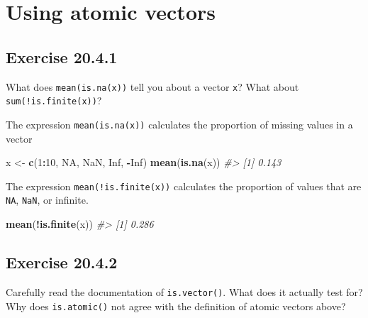 \documentclass[]{book}
\newenvironment{Shaded}{\begin{snugshade}}{\end{snugshade}}
\newcommand{\CommentTok}[1]{\textcolor[rgb]{0.56,0.35,0.01}{\textit{#1}}}
\newcommand{\DecValTok}[1]{\textcolor[rgb]{0.00,0.00,0.81}{#1}}
\newcommand{\KeywordTok}[1]{\textcolor[rgb]{0.13,0.29,0.53}{\textbf{#1}}}
\newcommand{\NormalTok}[1]{#1}
\newcommand{\OperatorTok}[1]{\textcolor[rgb]{0.81,0.36,0.00}{\textbf{#1}}}
\newcommand{\OtherTok}[1]{\textcolor[rgb]{0.56,0.35,0.01}{#1}}
\newcommand{\StringTok}[1]{\textcolor[rgb]{0.31,0.60,0.02}{#1}}
\theoremstyle{plain}
\theoremstyle{remark}
\theoremstyle{definition}
\theoremstyle{definition}
\theoremstyle{definition}
\theoremstyle{remark}
\begin{document}
\hypertarget{using-atomic-vectors}{%
\section{Using atomic vectors}\label{using-atomic-vectors}}

\hypertarget{exercise-20.4.1}{%
\subsection*{\texorpdfstring{Exercise
{20.4.1}}{Exercise 20.4.1}}\label{exercise-20.4.1}}

What does \texttt{mean(is.na(x))} tell you about a vector \texttt{x}?
What about \texttt{sum(!is.finite(x))}?

The expression \texttt{mean(is.na(x))} calculates the proportion of
missing values in a vector

\begin{Shaded}
\begin{Highlighting}[]
\NormalTok{x <-}\StringTok{ }\KeywordTok{c}\NormalTok{(}\DecValTok{1}\OperatorTok{:}\DecValTok{10}\NormalTok{, }\OtherTok{NA}\NormalTok{, }\OtherTok{NaN}\NormalTok{, }\OtherTok{Inf}\NormalTok{, }\OperatorTok{-}\OtherTok{Inf}\NormalTok{)}
\KeywordTok{mean}\NormalTok{(}\KeywordTok{is.na}\NormalTok{(x))}
\CommentTok{#> [1] 0.143}
\end{Highlighting}
\end{Shaded}

The expression \texttt{mean(!is.finite(x))} calculates the proportion of
values that are \texttt{NA}, \texttt{NaN}, or infinite.

\begin{Shaded}
\begin{Highlighting}[]
\KeywordTok{mean}\NormalTok{(}\OperatorTok{!}\KeywordTok{is.finite}\NormalTok{(x))}
\CommentTok{#> [1] 0.286}
\end{Highlighting}
\end{Shaded}

\hypertarget{exercise-20.4.2}{%
\subsection*{\texorpdfstring{Exercise
{20.4.2}}{Exercise 20.4.2}}\label{exercise-20.4.2}}

Carefully read the documentation of \texttt{is.vector()}. What does it
actually test for? Why does \texttt{is.atomic()} not agree with the
definition of atomic vectors above?
\end{document}
